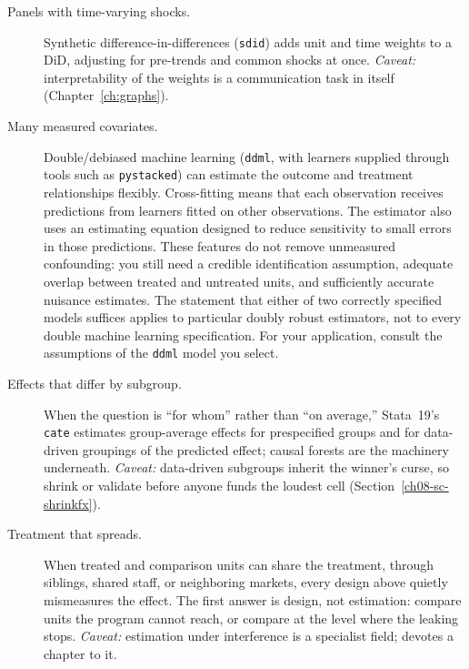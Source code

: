 \begin{description}
    \item[Panels with time-varying shocks.] Synthetic difference-in-differences (\texttt{sdid}) adds unit and time weights to a DiD, adjusting for pre-trends and common shocks at once. \emph{Caveat:} interpretability of the weights is a communication task in itself (Chapter~\ref{ch:graphs}).
    \item[Many measured covariates.] Double/debiased machine learning (\texttt{ddml}, with learners supplied through tools such as \texttt{pystacked}) can estimate the outcome and treatment relationships flexibly. Cross-fitting means that each observation receives predictions from learners fitted on other observations. The estimator also uses an estimating equation designed to reduce sensitivity to small errors in those predictions. These features do not remove unmeasured confounding: you still need a credible identification assumption, adequate overlap between treated and untreated units, and sufficiently accurate nuisance estimates. The statement that either of two correctly specified models suffices applies to particular doubly robust estimators, not to every double machine learning specification. For your application, consult the assumptions of the \texttt{ddml} model you select.
    \item[Effects that differ by subgroup.] When the question is \enquote{for whom} rather than \enquote{on average,} Stata~19's \texttt{cate} estimates group-average effects for prespecified groups and for data-driven groupings of the predicted effect; causal forests \parencite{wager2018forests} are the machinery underneath. \emph{Caveat:} data-driven subgroups inherit the winner's curse, so shrink or validate before anyone funds the loudest cell (Section~\ref{ch08-sc-shrinkfx}).
    \item[Treatment that spreads.] When treated and comparison units can share the treatment, through siblings, shared staff, or neighboring markets, every design above quietly mismeasures the effect. The first answer is design, not estimation: compare units the program cannot reach, or compare at the level where the leaking stops. \emph{Caveat:} estimation under interference is a specialist field; \textcite{huber2023causal} devotes a chapter to it.
\end{description}

